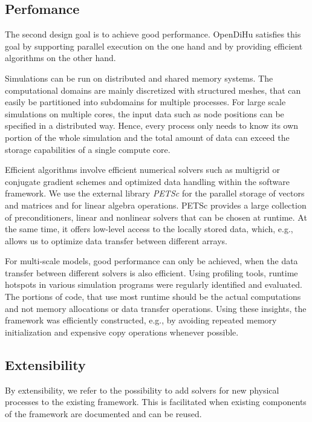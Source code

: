 \subsection{Perfomance}
The second design goal is to achieve good performance.
OpenDiHu satisfies this goal by supporting parallel execution on the one hand and by providing efficient algorithms on the other hand. 

Simulations can be run on distributed and shared memory systems. The computational domains are mainly discretized with structured meshes, that can easily be partitioned into subdomains for multiple processes. For large scale simulations on multiple cores, the input data such as node positions can be specified in a distributed way. Hence, every process only needs to know its own portion of the whole simulation and the total amount of data can exceed the storage capabilities of a single compute core.

Efficient algorithms involve efficient numerical solvers such as multigrid or conjugate gradient schemes and optimized data handling within the software framework.
We use the external library \emph{PETSc} \cite{petsc-efficient1997} for the parallel storage of vectors and matrices and for linear algebra operations. PETSc provides a large collection of preconditioners, linear and nonlinear solvers that can be chosen at runtime. At the same time, it offers low-level access to the locally stored data, which, e.g., allows us to optimize data transfer between different arrays.

For multi-scale models, good performance can only be achieved, when the data transfer between different solvers is also efficient. Using profiling tools, runtime hotspots in various simulation programs were regularly identified and evaluated. The portions of code, that use  most runtime should be the actual computations and not memory allocations or data transfer operations.
Using these insights, the framework was efficiently constructed, e.g., by avoiding repeated memory initialization and expensive copy operations whenever possible.

\subsection{Extensibility}
By extensibility, we refer to the possibility to add solvers for new physical processes to the existing framework.
This is facilitated when existing components of the framework are documented and can be reused. 


